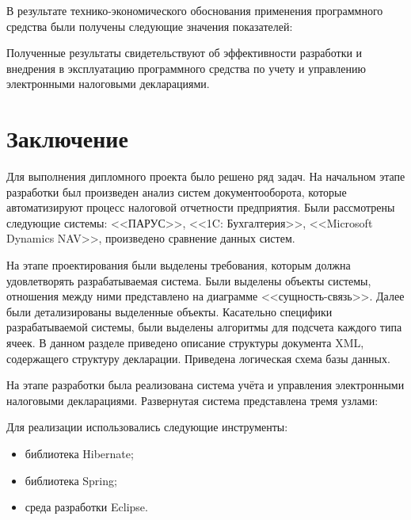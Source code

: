 \documentclass[14pt,a4paper]{reportmod}
\begin{document}
В результате технико-экономического обоснования применения программного средства были получены следующие значения показателей:
\begin{gostenumerate}
\end{gostenumerate}

Полученные результаты свидетельствуют об эффективности разработки и внедрения в эксплуатацию программного средства по учету и управлению электронными налоговыми декларациями.

\chapter*{Заключение}
Для выполнения дипломного проекта было решено ряд задач. На начальном этапе разработки был произведен анализ систем документооборота, которые автоматизируют процесс налоговой отчетности предприятия. Были рассмотрены следующие системы: <<ПАРУС>>, <<1C: Бухгалтерия>>, <<Microsoft Dynamics NAV>>, произведено сравнение данных систем.

На этапе проектирования были выделены требования, которым должна удовлетворять разрабатываемая система. Были выделены объекты системы, отношения между ними представлено на диаграмме <<сущность-связь>>. Далее были детализированы выделенные объекты. Касательно специфики разрабатываемой системы, были выделены алгоритмы для подсчета каждого типа ячеек. В данном разделе приведено описание структуры документа XML, содержащего структуру декларации. Приведена логическая схема базы данных.

На этапе разработки была реализована система учёта и управления электронными налоговыми декларациями. Развернутая система представлена тремя узлами:
\begin{gostitemize}
\end{gostitemize}

Для реализации использовались следующие инструменты:
\begin{itemize}
  \item библиотека Hibernate;
  \item библиотека Spring;
  \item среда разработки Eclipse.
\end{itemize}
\end{document}
